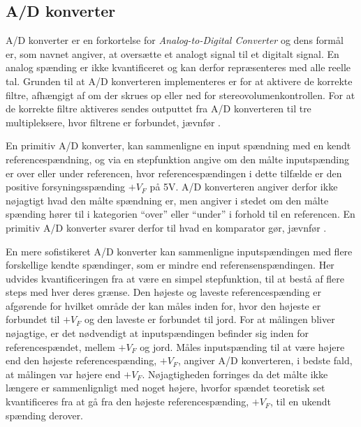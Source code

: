 \subsection{A/D konverter}
\label{ADKonverter}
%
A/D konverter er en forkortelse for \textit{Analog-to-Digital Converter} og dens formål er, som navnet angiver, at oversætte et analogt signal til et digitalt signal. En analog spænding er ikke kvantificeret og kan derfor repræsenteres med alle reelle tal. Grunden til at A/D konverteren implementeres er for at aktivere de korrekte filtre, afhængigt af om der skrues op eller ned for stereovolumenkontrollen. For at de korrekte filtre aktiveres sendes outputtet fra A/D konverteren til tre multipleksere, hvor filtrene er forbundet, jævnfør . 

En primitiv A/D konverter, kan sammenligne en input spændning med en kendt referencespændning, og via en stepfunktion angive om den målte inputspænding er over eller under referencen, hvor referencespændingen i dette tilfælde er den positive forsyningsspænding $+V_F$ på 5V. A/D konverteren angiver derfor ikke nøjagtigt hvad den målte spændning er, men angiver i stedet om den målte spænding hører til i kategorien “over” eller “under” i forhold til en referencen. En primitiv A/D konverter svarer derfor til hvad en komparator gør, jævnfør . 

En mere sofistikeret A/D konverter kan sammenligne inputspændingen med flere forskellige kendte spændinger, som er mindre end referensenspændingen. Her udvides kvantificeringen fra at være en simpel stepfunktion, til at bestå af flere steps med hver deres grænse. Den højeste og laveste referencespænding er afgørende for hvilket område der kan måles inden for, hvor den højeste er forbundet til $+V_F$ og den laveste er forbundet til jord. For at målingen bliver nøjagtige, er det nødvendigt at inputspændingen befinder sig inden for referencespændet, mellem $+V_F$ og jord. Måles inputspænding til at være højere end den højeste referencespænding, $+V_F$, angiver A/D konverteren, i bedste fald, at målingen var højere end $+V_F$. Nøjagtigheden forringes da det målte ikke længere er sammenlignligt med noget højere, hvorfor spændet teoretisk set kvantificeres fra at gå fra den højeste referencespænding, $+V_F$, til en ukendt spænding derover.

